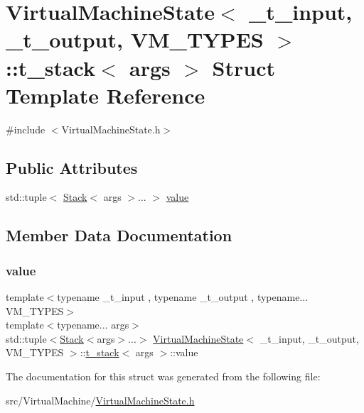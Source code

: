 \hypertarget{struct_virtual_machine_state_1_1t__stack}{}\section{Virtual\+Machine\+State$<$ \+\_\+t\+\_\+input, \+\_\+t\+\_\+output, V\+M\+\_\+\+T\+Y\+P\+ES $>$\+:\+:t\+\_\+stack$<$ args $>$ Struct Template Reference}
\label{struct_virtual_machine_state_1_1t__stack}


{\ttfamily \#include $<$Virtual\+Machine\+State.\+h$>$}

\subsection*{Public Attributes}
\begin{DoxyCompactItemize}
\item 
std\+::tuple$<$ \hyperlink{class_stack}{Stack}$<$ args $>$... $>$ \hyperlink{struct_virtual_machine_state_1_1t__stack_a15f3d1b1bc4fbbd9bf53ae62fc6096cb}{value}
\end{DoxyCompactItemize}


\subsection{Member Data Documentation}
\mbox{\label{struct_virtual_machine_state_1_1t__stack_a15f3d1b1bc4fbbd9bf53ae62fc6096cb}} 
\subsubsection{\texorpdfstring{value}{value}}
{\footnotesize\ttfamily template$<$typename \+\_\+t\+\_\+input , typename \+\_\+t\+\_\+output , typename... V\+M\+\_\+\+T\+Y\+P\+ES$>$ \\
template$<$typename... args$>$ \\
std\+::tuple$<$\hyperlink{class_stack}{Stack}$<$args$>$...$>$ \hyperlink{class_virtual_machine_state}{Virtual\+Machine\+State}$<$ \+\_\+t\+\_\+input, \+\_\+t\+\_\+output, V\+M\+\_\+\+T\+Y\+P\+ES $>$\+::\hyperlink{struct_virtual_machine_state_1_1t__stack}{t\+\_\+stack}$<$ args $>$\+::value}



The documentation for this struct was generated from the following file\+:\begin{DoxyCompactItemize}
\item 
src/\+Virtual\+Machine/\hyperlink{_virtual_machine_state_8h}{Virtual\+Machine\+State.\+h}\end{DoxyCompactItemize}
